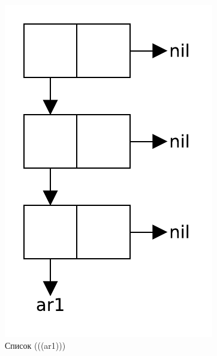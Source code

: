 \begin{figure}[H]
    \centering
    \includegraphics[scale=0.60]{data/pdf/02-03.pdf}
    \caption{Список (((ar1)))}
\end{figure}

